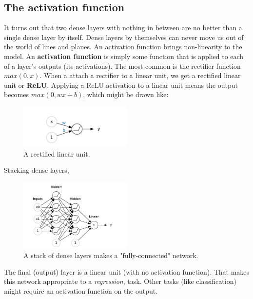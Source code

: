 \subsection{The activation function}
\noindent It turns out that two dense layers with nothing in between
are no better than a single dense layer by itself. Dense layers by
themselves can never move us out of the world of lines and planes. 
An activation function brings non-linearity to the model. An 
\textbf{activation function} is simply some function that is applied to
each of a layer's outputs (its activations). The most common is the
rectifier function $ max(0,x) $. When a attach a rectifier to a linear
unit, we get a rectified linear unit or \textbf{ReLU}. Applying a ReLU
activation to a linear unit means the output becomes $ max(0, wx + b) $,
which might be drawn like:

\begin{figure}[htp]
	\centering
	\includegraphics[width=0.5\textwidth]{../assets/machine_learning_random/rectified_linear_unit.jpg}
	\caption{A rectified linear unit.}
\end{figure}

\noindent Stacking dense layers,

\begin{figure}[htp]
	\centering
	\includegraphics[width=0.5\textwidth]{../assets/machine_learning_random/stack_of_dense_layers.jpg}
	\caption{A stack of dense layers makes a "fully-connected" network.}
\end{figure}

\noindent The final (output) layer is a linear unit (with no activation function).
That makes this network appropriate to a \emph{regression}, task. Other tasks (like
classification) might require an activation function on the output.

